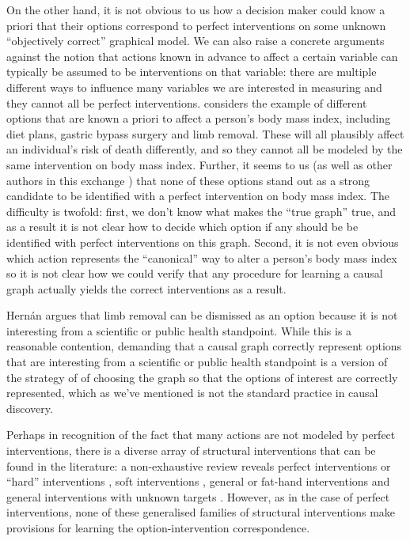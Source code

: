 \documentclass[USenglish,onecolumn]{article}
\begin{document}

On the other hand, it is not obvious to us how a decision maker could know a priori that their options correspond to perfect interventions on some unknown ``objectively correct'' graphical model. We can also raise a concrete arguments against the notion that actions known in advance to affect a certain variable can typically be assumed to be interventions on that variable: there are multiple different ways to influence many variables we are interested in measuring and they cannot all be perfect interventions. \citet{hernan_does_2008,noauthor_does_2016} considers the example of different options that are known a priori to affect a person's body mass index, including diet plans, gastric bypass surgery and limb removal. These will all plausibly affect an individual's risk of death differently, and so they cannot all be modeled by the same intervention on body mass index. Further, it seems to us (as well as other authors in this exchange \citep{pearl_does_2018,hernanInvitedCommentaryCausal2009,shahar_association_2009}) that none of these options stand out as a strong candidate to be identified with a perfect intervention on body mass index. The difficulty is twofold: first, we don't know what makes the ``true graph'' true, and as a result it is not clear how to decide which option if any should be be identified with perfect interventions on this graph. Second, it is not even obvious which action represents the ``canonical'' way to alter a person's body mass index so it is not clear how we could verify that any procedure for learning a causal graph actually yields the correct interventions as a result.

Hernán argues that limb removal can be dismissed as an option because it is not interesting from a scientific or public health standpoint. While this is a reasonable contention, demanding that a causal graph correctly represent options that are interesting from a scientific or public health standpoint is a version of the strategy of of choosing the graph so that the options of interest are correctly represented, which as we've mentioned is not the standard practice in causal discovery.

Perhaps in recognition of the fact that many actions are not modeled by perfect interventions, there is a diverse array of structural interventions that can be found in the literature: a non-exhaustive review reveals perfect interventions or ``hard'' interventions \citep[ch. ~1]{pearl_causality:_2009,hauser_characterization_2012}, soft interventions \citep{correa_calculus_2020,eberhardt_interventions_2007}, general or fat-hand interventions \citep{eberhardt_interventions_2007,yang_characterizing_2018,glymour_evaluating_2017} and general interventions with unknown targets \citep{brouillard_differentiable_2020}. However, as in the case of perfect interventions, none of these generalised families of structural interventions make provisions for learning the option-intervention correspondence.
\end{document}
